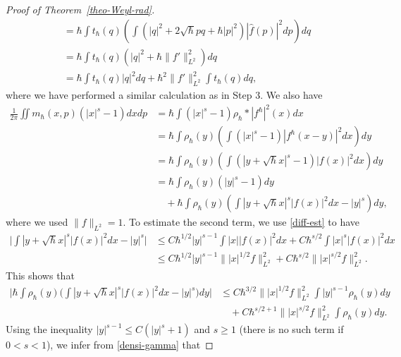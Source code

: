 \documentclass[%
11pt,  reqno]{amsart}
\theoremstyle{remarkstyle}
\newcommand{\1}{\hspace{0.2mm}\text{I}\hspace{0.2mm}}
\numberwithin{equation}{section}
\numberwithin{theorem}{section}
\begin{document}
\begin{proof}[Proof of Theorem~\ref{theo-Weyl-rad}]
\begin{align*}
			&= \hbar \int t_{\hbar}(q) \left(\int (|q|^2+2\sqrt{\hbar}pq + \hbar |p|^2) |\hat{f}(p)|^2dp \right) dq \\
			&= \hbar \int t_{\hbar}(q) \left(|q|^2+ \hbar \|f'\|^2_{L^2} \right) dq \\
			&= \hbar \int t_{\hbar}(q) |q|^2 dq + \hbar^2 \|f'\|^2_{L^2} \int t_\hbar(q) dq,
		\end{align*}
		where we have performed a similar calculation as in Step 3. We also have
		\begin{align*}
			\frac{1}{2\pi}\iint m_{\hbar}(x,p)(|x|^s-1) dxdp %
			&=\hbar \int (|x|^s-1) \rho_{\hbar}\ast |f^{\hbar}|^2(x) dx \\
			&= \hbar \int \rho_{\hbar}(y) \left(\int (|x|^s-1) |f^{\hbar}(x-y)|^2 dx\right) dy \\
			&= \hbar \int \rho_{\hbar}(y) \left(\int (|y+\sqrt{\hbar}x|^s-1) |f(x)|^2 dx\right) dy \\
			&= \hbar \int \rho_{\hbar}(y) (|y|^s-1) dy \\
			&\quad + \hbar \int \rho_{\hbar}(y) \left( \int |y+\sqrt{\hbar} x|^s|f(x)|^2 dx - |y|^s \right) dy,
		\end{align*}
		where we used $\|f\|_{L^2}=1$. To estimate the second term, we use \eqref{diff-est} to have
		\begin{align*}
			\Big|\int |y+\sqrt{\hbar}x|^s|f(x)|^2 dx - |y|^s\Big| &\leq C \hbar^{1/2} |y|^{s-1} \int |x| |f(x)|^2 dx + C \hbar^{s/2} \int |x|^s|f(x)|^2 dx \\
			&\leq C\hbar^{1/2} |y|^{s-1} \||x|^{1/2}f\|^2_{L^2} + C\hbar^{s/2} \||x|^{s/2} f\|^2_{L^2}.
		\end{align*}
		This shows that
		\begin{align*}
			\Big|\hbar \int \rho_{\hbar}(y) \Big( \int |y+\sqrt{\hbar} x|^s|f(x)|^2 dx - |y|^s \Big) dy\Big| &\leq C\hbar^{3/2} \||x|^{1/2}f\|^2_{L^2} \int |y|^{s-1}\rho_{\hbar}(y)dy \\
			&\quad + C\hbar^{s/2+1}\||x|^{s/2}f\|^2_{L^2} \int \rho_{\hbar}(y) dy.
		\end{align*}
		Using the inequality $|y|^{s-1} \leq C(|y|^s+1)$ and $s\geq 1$ (there is no such term if $0<s<1$), we infer from \eqref{densi-gamma} that

\end{proof}
\end{document}
